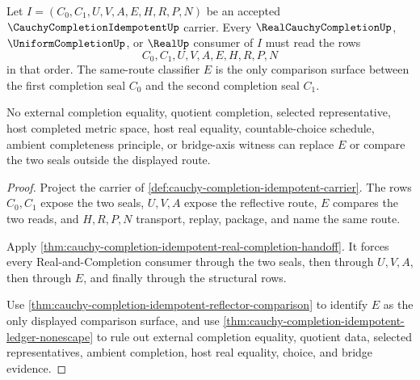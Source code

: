\begin{theorem}
\label{thm:cauchy-completion-idempotent-real-completion-consumer-exactness}
Let $I=(C_0,C_1,U,V,A,E,H,R,P,N)$ be an accepted $\CauchyCompletionIdempotentUp$ carrier. Every $\RealCauchyCompletionUp$, $\UniformCompletionUp$, or $\RealUp$ consumer of $I$ must read the rows
$$
C_0,C_1,U,V,A,E,H,R,P,N
$$
in that order. The same-route classifier $E$ is the only comparison surface between the first completion seal $C_0$ and the second completion seal $C_1$.

No external completion equality, quotient completion, selected representative, host completed metric space, host real equality, countable-choice schedule, ambient completeness principle, or bridge-axis witness can replace $E$ or compare the two seals outside the displayed route.
\end{theorem}
\begin{proof}
Project the carrier of \autoref{def:cauchy-completion-idempotent-carrier}. The rows $C_0,C_1$ expose the two seals, $U,V,A$ expose the reflective route, $E$ compares the two reads, and $H,R,P,N$ transport, replay, package, and name the same route.

Apply \autoref{thm:cauchy-completion-idempotent-real-completion-handoff}. It forces every Real-and-Completion consumer through the two seals, then through $U,V,A$, then through $E$, and finally through the structural rows.

Use \autoref{thm:cauchy-completion-idempotent-reflector-comparison} to identify $E$ as the only displayed comparison surface, and use \autoref{thm:cauchy-completion-idempotent-ledger-nonescape} to rule out external completion equality, quotient data, selected representatives, ambient completion, host real equality, choice, and bridge evidence.
\end{proof}

